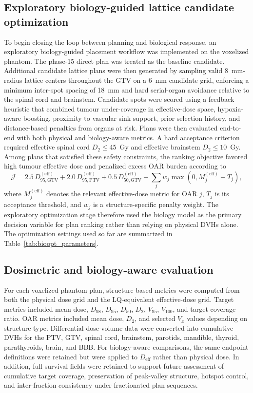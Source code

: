\subsection{Exploratory biology-guided lattice candidate optimization}
To begin closing the loop between planning and biological response, an exploratory biology-guided placement workflow was implemented on the voxelized phantom. The phase-15 direct plan was treated as the baseline candidate. Additional candidate lattice plans were then generated by sampling valid 8~mm-radius lattice centers throughout the GTV on a 6~mm candidate grid, enforcing a minimum inter-spot spacing of 18~mm and hard serial-organ avoidance relative to the spinal cord and brainstem. Candidate spots were scored using a feedback heuristic that combined tumour under-coverage in effective-dose space, hypoxia-aware boosting, proximity to vascular sink support, prior selection history, and distance-based penalties from organs at risk. Plans were then evaluated end-to-end with both physical and biology-aware metrics. A hard acceptance criterion required effective spinal cord $D_{2} \leq 45$~Gy and effective brainstem $D_{2} \leq 10$~Gy. Among plans that satisfied these safety constraints, the ranking objective favored high tumour effective dose and penalized excess OAR burden according to
\[
\mathcal{J} = 2.5\,D_{95,\mathrm{GTV}}^{(\mathrm{eff})} + 2.0\,D_{95,\mathrm{PTV}}^{(\mathrm{eff})} + 0.5\,D_{50,\mathrm{GTV}}^{(\mathrm{eff})} - \sum_j w_j \max\!\left(0, M_j^{(\mathrm{eff})} - T_j\right),
\]
where $M_j^{(\mathrm{eff})}$ denotes the relevant effective-dose metric for OAR $j$, $T_j$ is its acceptance threshold, and $w_j$ is a structure-specific penalty weight. The exploratory optimization stage therefore used the biology model as the primary decision variable for plan ranking rather than relying on physical DVHs alone. The optimization settings used so far are summarized in Table~\ref{tab:bioopt_parameters}.

\subsection{Dosimetric and biology-aware evaluation}
For each voxelized-phantom plan, structure-based metrics were computed from both the physical dose grid and the LQ-equivalent effective-dose grid. Target metrics included mean dose, $D_{98}$, $D_{95}$, $D_{50}$, $D_{2}$, $V_{95}$, $V_{100}$, and target coverage ratio. OAR metrics included mean dose, $D_{2}$, and selected $V_x$ values depending on structure type. Differential dose-volume data were converted into cumulative DVHs for the PTV, GTV, spinal cord, brainstem, parotids, mandible, thyroid, parathyroids, brain, and BBB. For biology-aware comparisons, the same endpoint definitions were retained but were applied to $D_{\mathrm{eff}}$ rather than physical dose. In addition, full survival fields were retained to support future assessment of cumulative target coverage, preservation of peak-valley structure, hotspot control, and inter-fraction consistency under fractionated plan sequences.
